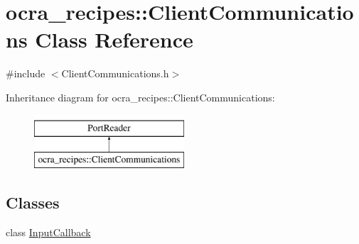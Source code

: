 \hypertarget{classocra__recipes_1_1ClientCommunications}{}\section{ocra\+\_\+recipes\+:\+:Client\+Communications Class Reference}
\label{classocra__recipes_1_1ClientCommunications}


{\ttfamily \#include $<$Client\+Communications.\+h$>$}

Inheritance diagram for ocra\+\_\+recipes\+:\+:Client\+Communications\+:\begin{figure}[H]
\begin{center}
\leavevmode
\includegraphics[height=2.000000cm]{df/dca/classocra__recipes_1_1ClientCommunications}
\end{center}
\end{figure}
\subsection*{Classes}
\begin{DoxyCompactItemize}
\item 
class \hyperlink{classocra__recipes_1_1ClientCommunications_1_1InputCallback}{Input\+Callback}
\end{DoxyCompactItemize}
